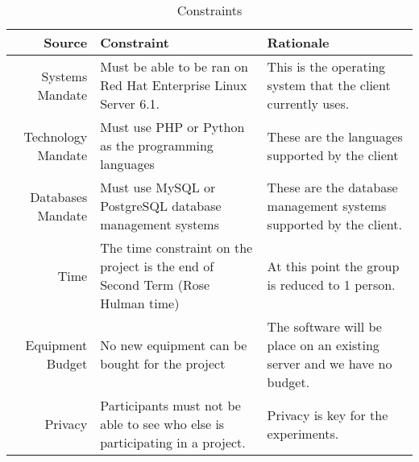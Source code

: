 \documentclass[11pt]{article}
\begin{document}
	\addtolength{\topmargin}{-2.875in}
	\addtolength{\textheight}{1.75in}
\begin{table}


  \caption{Constraints}
    \begin{tabular}{| r | p{5.5cm} | p{5.5cm} |}
    \hline
    Source & Constraint & Rationale \\
    \hline
    Systems Mandate & Must be able to be ran on Red Hat Enterprise Linux Server 6.1. & This is the operating system that the client currently uses. \\
    \hline
    Technology Mandate & Must use PHP or Python as the programming languages & These are the languages supported by the client \\
    \hline
    Databases Mandate & Must use MySQL or PostgreSQL database management systems & These are the database management systems supported by the client. \\
    \hline
    Time  & The time constraint on the project is the end of Second Term (Rose Hulman time) & At this point the group is reduced to 1 person. \\
    \hline
    Equipment Budget & No new equipment can be bought for the project & The software will be place on an existing server and we have no budget. \\
    \hline
    Privacy & Participants must not be able to see who else is participating in a project. & Privacy is key for the experiments. \\
    \hline
    \end{tabular}%
\end{table}%
\end{document}
